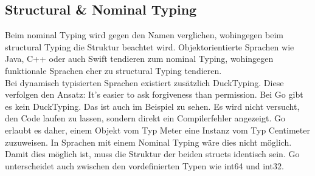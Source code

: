 \documentclass[12pt,titlepage]{article}
\begin{document}
\subsection{Structural \& Nominal Typing}
Beim nominal Typing wird gegen den Namen verglichen, wohingegen beim structural Typing die Struktur beachtet wird. Objektorientierte Sprachen wie Java, C++ oder auch Swift tendieren zum nominal Typing, wohingegen funktionale Sprachen eher zu structural Typing tendieren. \\
Bei dynamisch typisierten Sprachen existiert zusätzlich DuckTyping. Diese verfolgen den Ansatz: It's easier to ask forgiveness than permission. Bei Go gibt es kein DuckTyping. Das ist auch im Beispiel zu sehen. Es wird nicht versucht, den Code laufen zu lassen, sondern direkt ein Compilerfehler angezeigt.
Go erlaubt es daher, einem Objekt vom Typ Meter eine Instanz vom Typ Centimeter zuzuweisen. In Sprachen mit einem Nominal Typing wäre dies nicht möglich. Damit dies möglich ist, muss die Struktur der beiden structs identisch sein. Go unterscheidet auch zwischen den vordefinierten Typen wie int64 und int32. 
\end{document}
